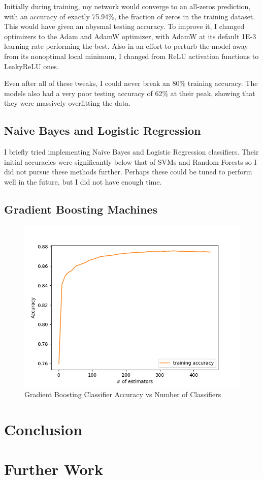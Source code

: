 \documentclass{article}
\begin{document}
Initially during training, my network would converge to an all-zeros prediction, with an accuracy of exactly 75.94\%, the fraction of zeros in the training dataset. This would have given an abysmal testing accuracy. To improve it, I changed optimizers to the Adam and AdamW optimizer, with AdamW at its default 1E-3 learning rate performing the best. Also in an effort to perturb the model away from its nonoptimal local minimum, I changed from ReLU activation functions to LeakyReLU ones.  

Even after all of these tweaks, I could never break an 80\% training accuracy. The models also had a very poor testing accuracy of 62\% at their peak, showing that they were massively overfitting the data. 

\subsection{Naive Bayes and Logistic Regression}
I briefly tried implementing Naive Bayes and Logistic Regression classifiers. Their initial accuracies were significantly below that of SVMs and Random Forests so I did not pursue these methods further. Perhaps these could be tuned to perform well in the future, but I did not have enough time. 

\subsection{Gradient Boosting Machines}

\begin{figure}[h]
    \centering
    \includegraphics[width=0.6\linewidth]{img/gbm_acc.png}
    \caption{Gradient Boosting Classifier Accuracy vs Number of Classifiers}
    \label{fig:gbm}
\end{figure}

\section{Conclusion}


\section{Further Work}
\end{document}
